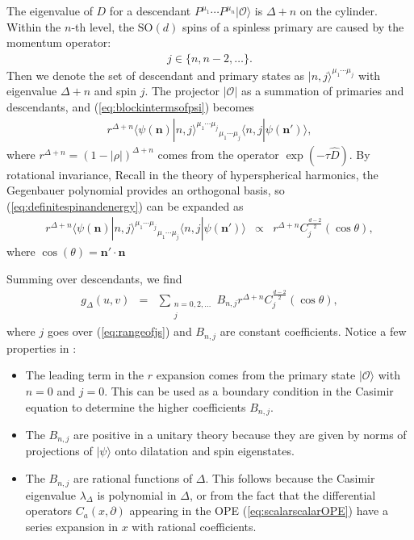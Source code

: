 \documentclass[12pt]{article}
\numberwithin{equation}{section}
\newcommand\be{\begin{eqnarray}}
\newcommand\ee{\end{eqnarray}}
\newcommand\cO{\mathcal{O}}
\newcommand\ptl\partial
\newcommand\<\langle
\renewcommand\>\rangle
\renewcommand\.{\cdot}
\newcommand\SO{\mathrm{SO}}
\newcommand\De{\Delta}
\newcommand\bn{\mathbf{n}}
\renewcommand\l\lambda
\renewcommand\th{\theta}
\begin{document}
The eigenvalue of $D$ for a descendant $P^{\mu_1}\cdots P^{\mu_n}|\cO\>$ is $\De+n$ on the cylinder. 
Within the $n$-th level, the $\SO(d)$ spins of a spinless primary are caused by the momentum operator:
\be
\label{eq:rangeofjs}
j \in \{n,n-2,\dots\}.
\ee
Then we denote the set of descendant and primary states as $|n,j\>^{\mu_1\cdots\mu_j}$ with eigenvalue $\De+n$ and spin $j$. The projector $|\cO|$ as a summation of primaries and descendants, and (\ref{eq:blockintermsofpsi}) becomes
\be
r^{\De+n} \<\psi(\bn)|n,j\>^{\mu_1\cdots\mu_j}{}_{\mu_1\cdots\mu_j}\<n,j|\psi(\bn')\>,
\label{eq:definitespinandenergy}
\ee
where $r^{\De+n} = (1-|\rho|)^{\De+n}$ comes from the operator $\exp(-\tau\hat D)$.
By rotational invariance,
Recall in the theory of hyperspherical harmonics, the Gegenbauer polynomial provides an orthogonal basis,
so (\ref{eq:definitespinandenergy}) can be expanded as
\be
r^{\De+n} \<\psi(\bn)|n,j\>^{\mu_1\cdots\mu_j}{}_{\mu_1\cdots\mu_j}\<n,j|\psi(\bn')\> &\propto& r^{\De+n}C_j^{\frac{d-2}{2}}(\cos\th),
\ee
where $\cos(\th) = \bn'\.\bn$

Summing over descendants, we find
\be
\label{eq:seriesexpansion}
g_{\De}(u,v) &=& \sum_{\substack{n=0,2,\dots \\ j}} B_{n,j}r^{\De+n}C_j^{\frac{d-2}{2}}(\cos\th),\label{eq:seriesforblock}
\ee
where $j$ goes over (\ref{eq:rangeofjs}) and $B_{n,j}$ are constant coefficients.  
Notice a few properties in \cite{simmonsduffin2016tasilecturesconformalbootstrap}:
\begin{itemize}
\item The leading term in the $r$ expansion comes from the primary state $|\cO\>$ with $n=0$ and $j=0$. This can be used as a boundary condition in the Casimir equation to determine the higher coefficients $B_{n,j}$.
\item The $B_{n,j}$ are positive in a unitary theory because they are given by norms of projections of $|\psi\>$ onto dilatation and spin eigenstates.
\item The $B_{n,j}$ are rational functions of $\De$.  This follows because the Casimir eigenvalue $\l_{\De}$ is polynomial in $\De$, or from the fact that the differential operators $C_a(x,\ptl)$ appearing in the OPE (\ref{eq:scalarscalarOPE}) have a series expansion in $x$ with rational coefficients. 
\end{itemize}
\end{document}
